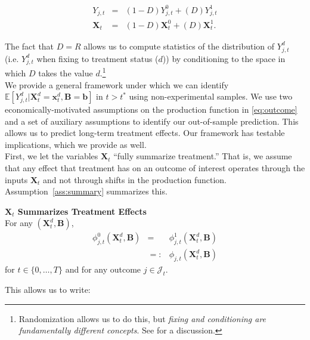\begin{eqnarray}
Y_{j,t}        &=& \left( 1 - D \right) Y_{j,t}^0    + \left( D \right) Y_{j,t}^1 \nonumber \\
\bm{X}_{t} &=& \left( 1 - D \right) \bm{X}_{t}^0 + \left( D \right) \bm{X}_{t}^1. \label{eq:countersystem}
\end{eqnarray}

\noindent The fact that $D = R$ allows us to compute statistics of the distribution of $Y_{j,t}^d$ (i.e. $Y_{j,t}^d$ when fixing to treatment status ($d$)) by conditioning to the space in which $D$ takes the value $d$.\footnote{Randomization allows us to do this, but \textit{fixing and conditioning are fundamentally different concepts}. See \citet{Heckman_Pinto_2015_EconometTheory} for a discussion.}\\

\noindent We provide a general framework under which we can identify $\mathbb{E} \left[ Y_{j,t}^d | \bm{X}_{t}^d = \bm{x}_t^d, \bm{B} = \bm{b}  \right]$ in $t > t^*$ using non-experimental samples. We use two economically-motivated assumptions on the production function in \eqref{eq:outcome} and a set of auxiliary assumptions to identify our out-of-sample prediction. This allows us to predict long-term treatment effects. Our framework has testable implications, which we provide as well.\\

\noindent First, we let the variables $\bm{X}_{t}$ ``fully summarize treatment.'' That is, we assume that any effect that treatment has on an outcome of interest operates through the inputs $\bm{X}_{t}$ and not through shifts in the production function. Assumption~\ref{ass:summary} summarizes this.

\begin{assumption} \label{ass:summary} \textbf{$\bm{X}_{t}$ Summarizes Treatment Effects}\\
For any $\left( \bm{X}_{t}^d, \bm{B} \right)$, 
\begin{eqnarray}
\phi_{j,t}^0 \left( \bm{X}_{t}^d, \bm{B} \right) &=& \phi_{j,t}^1 \left( \bm{X}_{t}^d, \bm{B} \right) \\   \nonumber 
                                                                     &=:& \phi_{j,t} \left( \bm{X}_{t}^d, \bm{B} \right) 
\end{eqnarray}
\noindent for $t \in \{ 0, \ldots, T \}$ and for any outcome $j \in \mathcal{J}_{t}$.
\end{assumption}

\noindent This allows us to write: 


